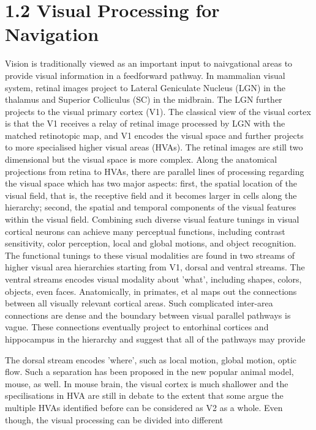 \section{1.2 Visual Processing for Navigation}
Vision is traditionally viewed as an important input to naivgational areas to provide visual information in a feedforward pathway. In mammalian visual system,  retinal images project to Lateral Geniculate Nucleus (LGN) in the thalamus and Superior Colliculus (SC) in the midbrain. The LGN further projects to the visual primary cortex (V1). The classical view of the visual cortex is that the V1 receives a relay of retinal image processed by LGN with the matched retinotopic map, and V1 encodes the visual space and further projects to more specialised higher visual areas (HVAs). The retinal images are still two dimensional but the visual space is more complex. Along the anatomical projections from retina to HVAs, there are parallel lines of processing regarding the visual space which has two major aspects: first, the spatial location of the visual field, that is, the receptive field and it becomes larger in cells along the hierarchy; second, the spatial and temporal components of the visual features within the visual field. Combining such diverse visual feature tunings in visual cortical neurons can achieve many perceptual functions, including contrast sensitivity, color perception, local and global motions, and object recognition. The functional tunings to these visual modalities are found in two streams of higher visual area hierarchies starting from V1, dorsal and ventral streams. The ventral streams encodes visual modality about 'what', including shapes, colors, objects, even faces. Anatomically, in primates, et al maps out the connections between all visually relevant cortical areas. Such complicated inter-area connections are dense and the boundary between visual parallel pathways is vague. These connections eventually project to entorhinal cortices and hippocampus in the hierarchy and suggest that all of the pathways may provide 

The dorsal stream encodes 'where', such as local motion, global motion, optic flow. Such a separation has been proposed in the new popular animal model, mouse, as well. In mouse brain, the visual cortex is much shallower and the specilisations in HVA are still in debate to the extent that some argue the multiple HVAs identified before can be considered as V2 as a whole. Even though, the visual processing can be divided into different 




